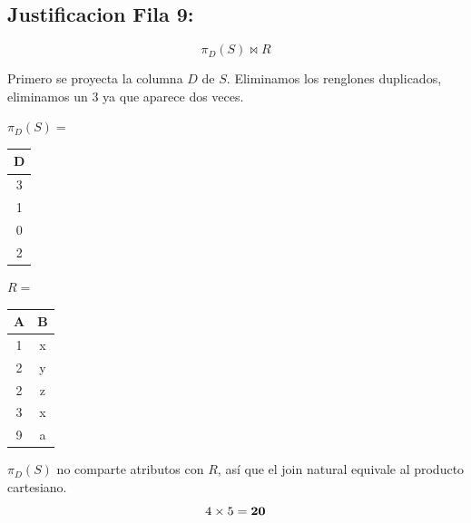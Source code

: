 \subsection*{Justificacion Fila 9:}

\[\pi_D(S) \bowtie R\]

Primero se proyecta la columna $D$ de $S$. Eliminamos los renglones duplicados, eliminamos un $3$ ya que aparece dos veces.

\begin{center}
$\pi_{D}(S) =$ \quad
\begin{tabular}{|c|}
\hline
\textbf{D} \\ \hline
  3 \\
  1 \\
  0 \\
  2 \\ \hline
\end{tabular}
\end{center}

\begin{center}
\begin{minipage}{0.35\textwidth}
  \centering
  $R =$ \quad
  \begin{tabular}{|c|c|}
    \hline
    \textbf{A} & \textbf{B} \\ \hline
    1 & x \\
    2 & y \\
    2 & z \\
    3 & x \\
    9 & a \\ \hline
  \end{tabular}
\end{minipage}
\end{center}

$\pi_{D}(S) $ no comparte atributos con $R$, así que el join natural equivale al producto cartesiano.
\[4 \times 5 = \text{\textbf{20}}\]
